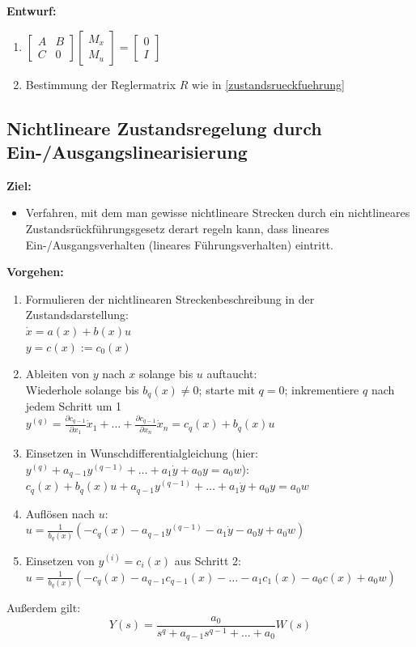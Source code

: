 \documentclass[10pt,a4paper]{article}
\newcommand{\vect}[1]{\ensuremath{\begin{bmatrix}#1\end{bmatrix}}}
\begin{document}
\textbf{Entwurf:}
\begin{enumerate}
	\item $
	\vect{A & B \\ C & 0} \vect{M_x \\ M_u} = \vect{0 \\ I}
	$
	\item Bestimmung der Reglermatrix $R$ wie in \ref{zustandsrueckfuehrung}
\end{enumerate}

\subsection{Nichtlineare Zustandsregelung durch Ein-/Ausgangslinearisierung}
\textbf{Ziel:}
\begin{itemize}
	\item Verfahren, mit dem man gewisse nichtlineare Strecken durch ein nichtlineares Zustandsrückführungsgesetz derart regeln kann, dass lineares Ein-/Ausgangsverhalten (lineares Führungsverhalten) eintritt.
\end{itemize}

\textbf{Vorgehen:}
\begin{enumerate}
	\item Formulieren der nichtlinearen Streckenbeschreibung in der Zustandsdarstellung: \\
	$\dot x = a(x) + b(x) u$ \\
	$y = c(x) := c_0(x)$
	\item Ableiten von $y$ nach $x$ solange bis $u$ auftaucht: \\
	Wiederhole solange bis $b_q(x) ≠ 0$; starte mit $q = 0$; inkrementiere $q$ nach jedem Schritt um 1\\
	$y^{(q)} = \frac{\partial c_{q-1}}{\partial x_1} \dot x_1 + \dots + \frac{\partial c_{q-1}}{\partial x_n} \dot x_n = c_q(x) + b_q(x) u$
	\item Einsetzen in Wunschdifferentialgleichung (hier: $y^{(q)} + a_{q - 1}y^{(q-1)} + \dots + a_1 \dot y + a_0y = a_0 w$): \\
	$c_q(x) + b_q(x) u + a_{q-1} y^{(q-1)} + \dots + a_1 \dot y + a_0 y = a_0 w$
	\item Auflösen nach $u$: \\
	$u = \frac 1 {b_q(x)} (-c_q(x) - a_{q-1} y^{(q-1)} - a_1 \dot y - a_0 y + a_0 w)$
	\item Einsetzen von $y^{(i)} = c_i(x)$ aus Schritt 2: \\
	$u = \frac 1 {b_q(x)} (-c_q(x) - a_{q-1} c_{q-1}(x) - \dots - a_1 c_1(x) - a_0 c(x) + a_0 w)$
\end{enumerate}
Außerdem gilt:
$$
	Y(s) = \frac{a_0}{s^q + a_{q-1}s^{q-1} + \dots + a_0} W(s)
$$
\end{document}
